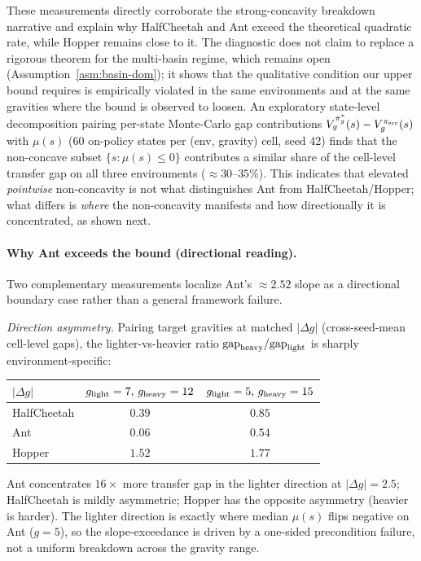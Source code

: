 \documentclass{article}
\begin{document}
These measurements directly corroborate the strong-concavity breakdown narrative and explain why HalfCheetah and Ant exceed the theoretical quadratic rate, while Hopper remains close to it. The diagnostic does not claim to replace a rigorous theorem for the multi-basin regime, which remains open (Assumption~\ref{asm:basin-dom}); it shows that the qualitative condition our upper bound requires is empirically violated in the same environments and at the same gravities where the bound is observed to loosen. An exploratory state-level decomposition pairing per-state Monte-Carlo gap contributions $V^{\pi^*_g}_g(s) - V^{\pi_{\rm src}}_g(s)$ with $\mu(s)$ ($60$ on-policy states per (env, gravity) cell, seed 42) finds that the non-concave subset $\{s : \mu(s) \leq 0\}$ contributes a similar share of the cell-level transfer gap on all three environments ($\approx 30$--$35\%$). This indicates that elevated \emph{pointwise} non-concavity is not what distinguishes Ant from HalfCheetah/Hopper; what differs is \emph{where} the non-concavity manifests and how directionally it is concentrated, as shown next.

\paragraph{Why Ant exceeds the bound (directional reading).} Two complementary measurements localize Ant's $\approx 2.52$ slope as a directional boundary case rather than a general framework failure.

\emph{Direction asymmetry.} Pairing target gravities at matched $|\Delta g|$ (cross-seed-mean cell-level gaps), the lighter-vs-heavier ratio $\mathrm{gap}_{\rm heavy}/\mathrm{gap}_{\rm light}$ is sharply environment-specific:
\begin{center}
\small
\begin{tabular}{lcc}
\toprule
$|\Delta g|$ & $g_{\rm light}=7,\,g_{\rm heavy}=12$ & $g_{\rm light}=5,\,g_{\rm heavy}=15$ \\
\midrule
HalfCheetah & $0.39$ & $0.85$ \\
Ant         & $\mathbf{0.06}$ & $\mathbf{0.54}$ \\
Hopper      & $1.52$ & $1.77$ \\
\bottomrule
\end{tabular}
\end{center}
Ant concentrates $16\times$ more transfer gap in the lighter direction at $|\Delta g|=2.5$; HalfCheetah is mildly asymmetric; Hopper has the opposite asymmetry (heavier is harder). The lighter direction is exactly where median $\mu(s)$ flips negative on Ant ($g{=}5$), so the slope-exceedance is driven by a one-sided precondition failure, not a uniform breakdown across the gravity range.
\end{document}
